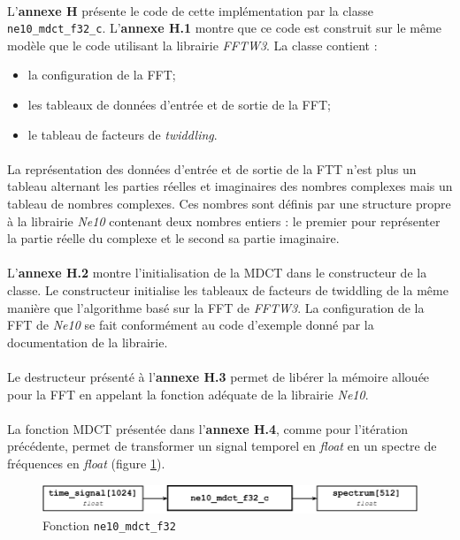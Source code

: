 \documentclass{article}
\begin{document}
    \paragraph{}
    L'\textbf{annexe H} présente le code de cette implémentation par la classe \texttt{ne10\_mdct\_f32\_c}. L'\textbf{annexe H.1} montre que ce code est construit sur le même modèle que le code utilisant la librairie \emph{FFTW3}. La classe contient :
    \begin{itemize}
        \item la configuration de la FFT;
        \item les tableaux de données d'entrée et de sortie de la FFT;
        \item le tableau de facteurs de \emph{twiddling}.
    \end{itemize}

    \paragraph{}
    La représentation des données d'entrée et de sortie de la FTT n'est plus un tableau alternant les parties réelles et imaginaires des nombres complexes mais un tableau de nombres complexes. Ces nombres sont définis par une structure propre à la librairie \emph{Ne10} contenant deux nombres entiers : le premier pour représenter la partie réelle du complexe et le second sa partie imaginaire.

    \paragraph{}
    L'\textbf{annexe H.2} montre l'initialisation de la MDCT dans le constructeur de la classe. Le constructeur initialise les tableaux de facteurs de twiddling de la même manière que l'algorithme basé sur la FFT de \emph{FFTW3}. La configuration de la FFT de \emph{Ne10} se fait conformément au code d'exemple donné par la documentation de la librairie\cite{Ne10}.

    \paragraph{}
    Le destructeur présenté à l'\textbf{annexe H.3} permet de libérer la mémoire allouée pour la FFT en appelant la fonction adéquate de la librairie \emph{Ne10}.

    \paragraph{}
    La fonction MDCT présentée dans l'\textbf{annexe H.4}, comme pour l'itération précédente, permet de transformer un signal temporel en \emph{float} en un spectre de fréquences en \emph{float} (figure \ref{fig:func_ne10_mdct_f32}).
    \begin{figure}[H]
        \centering
        \includegraphics[width=.8\linewidth]{./images/func_ne10_mdct_f32_c.pdf}
        \caption{Fonction \texttt{ne10\_mdct\_f32}}
        \label{fig:func_ne10_mdct_f32}
    \end{figure}
\end{document}
